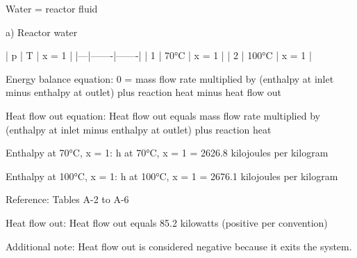 Water = reactor fluid  

a) Reactor water  

| p | T     | x = 1 |  
|---|-------|-------|  
| 1 | 70°C  | x = 1 |  
| 2 | 100°C | x = 1 |  

Energy balance equation:  
0 = mass flow rate multiplied by (enthalpy at inlet minus enthalpy at outlet) plus reaction heat minus heat flow out  

Heat flow out equation:  
Heat flow out equals mass flow rate multiplied by (enthalpy at inlet minus enthalpy at outlet) plus reaction heat  

Enthalpy at 70°C, x = 1:  
h at 70°C, x = 1 = 2626.8 kilojoules per kilogram  

Enthalpy at 100°C, x = 1:  
h at 100°C, x = 1 = 2676.1 kilojoules per kilogram  

Reference: Tables A-2 to A-6  

Heat flow out:  
Heat flow out equals 85.2 kilowatts (positive per convention)  

Additional note:  
Heat flow out is considered negative because it exits the system.